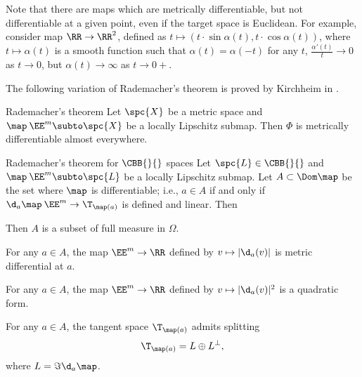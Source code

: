 Note that there are maps which are metrically differentiable,
but not differentiable at a given point,
even if the target space is Euclidean.
For example, consider map $\RR\to\RR^2$,
defined as $t\mapsto (t\cdot\sin\alpha(t), t\cdot\cos\alpha(t))$,
where $t\mapsto \alpha(t)$ is a smooth function such that 
$\alpha(t)=\alpha(-t)$ for any $t$,
$\tfrac{\alpha'(t)}t\to 0$ as $t\to 0$, 
but $\alpha(t)\to \infty$ as $t\to 0+$.

The following variation of Rademacher's theorem 
is proved by Kirchheim in \cite{kirchheim}.

\begin{thm}{Rademacher's theorem}\label{thm:rademacher}
Let $\spc{X}$ be a metric space 
and $\map\:\EE^m\subto\spc{X}$ be a locally Lipschitz submap.
Then $\Phi$ is metrically differentiable almost everywhere.
\end{thm}


\qeds

\begin{thm}{Rademacher's theorem for $\CBB{}{}$ spaces}
Let $\spc{L}\in\CBB{}{}$  
and $\map\:\EE^m\subto\spc{L}$ be a locally Lipschitz submap.
Let $A\subset \Dom \map$ be the set where $\map$ is differentiable;
i.e., $a\in A$ if and only if $\d_a\map\:\EE^m\to\T_{\map(a)}$ is defined and linear.
Then 
\begin{subthm}{}
Then $A$ is a subset of full measure in $\Omega$.
\end{subthm}

\begin{subthm}{}
For any $a\in A$,
the map $\EE^m\to\RR$ defined by $v\mapsto |\d_a(v)|$ is metric differential at $a$.
\end{subthm}

\begin{subthm}{}
For any $a\in A$,
the map $\EE^m\to\RR$ defined by $v\mapsto |\d_a(v)|^2$ is a quadratic form.
\end{subthm}

\begin{subthm}{}
For any $a\in A$, the tangent space
$\T_{\map(a)}$ admits splitting
\[\T_{\map(a)}=L\oplus L^\bot,\]
where $L=\Im\d_a\map$.
\end{subthm}
\end{thm}

